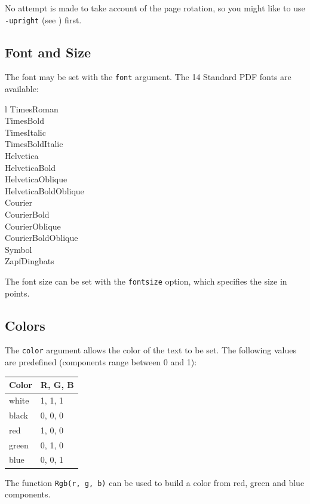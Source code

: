\documentclass[a4paper]{memoir}
\begin{document}
No attempt is made to take account of the page rotation, so you might like to
use \texttt{-upright} (see ) first.
   
\subsection{Font and Size}
  The font may be set with the \texttt{font} argument. The 14 Standard PDF fonts are available:

  \vspace{2mm}
  \begin{ctabular}{l}
  TimesRoman\\
  TimesBold\\
  TimesItalic\\
  TimesBoldItalic\\
  Helvetica\\
  HelveticaBold\\
  HelveticaOblique\\
  HelveticaBoldOblique\\
  Courier\\
  CourierBold\\
  CourierOblique\\
  CourierBoldOblique\\
  Symbol\\
  ZapfDingbats
  \end{ctabular}

\noindent The font size can be set with the \texttt{fontsize} option, which
specifies the size in points.
\subsection{Colors}
The \texttt{color} argument allows the color of the text to be set. The following values are predefined (components range between 0 and 1):

  \vspace{2mm}
  \begin{tabular}{ll}
    \textbf{Color} & \textbf{R, G, B} \\ \hline
     white & 1, 1, 1\\
     black & 0, 0, 0\\
     red & 1, 0, 0\\
     green & 0, 1, 0\\
     blue & 0, 0, 1\\
  \end{tabular}

\vspace{2mm}
\noindent The function \verb!Rgb(r, g, b)! can be used to build a color from red, green and blue components.
\end{document}
